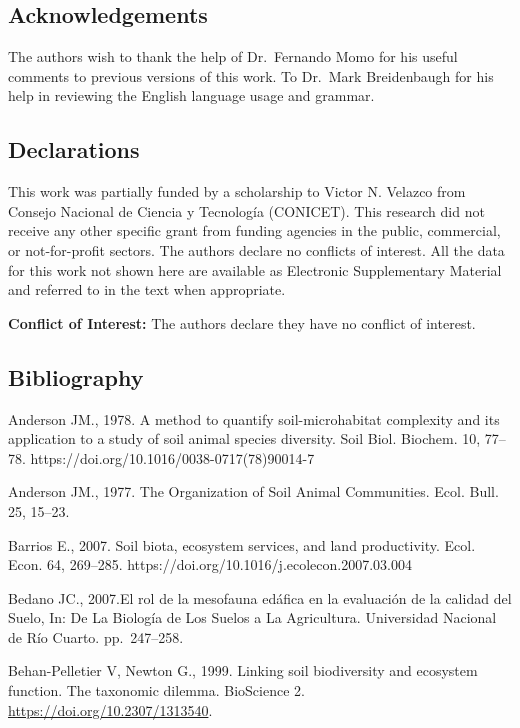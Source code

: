 \documentclass[10pt,oneside]{article}
\begin{document}
\hypertarget{acknowledgements}{%
\subsection{Acknowledgements}\label{acknowledgements}}

The authors wish to thank the help of Dr.~Fernando Momo for his useful
comments to previous versions of this work. To Dr.~Mark Breidenbaugh for
his help in reviewing the English language usage and grammar.

\hypertarget{declarations}{%
\subsection{Declarations}\label{declarations}}

This work was partially funded by a scholarship to Victor N. Velazco
from Consejo Nacional de Ciencia y Tecnología (CONICET). This research
did not receive any other specific grant from funding agencies in the
public, commercial, or not-for-profit sectors. The authors declare no
conflicts of interest. All the data for this work not shown here are
available as Electronic Supplementary Material and referred to in the
text when appropriate.

\textbf{Conflict of Interest:} The authors declare they have no conflict
of interest.

\hypertarget{bibliography}{%
\subsection{Bibliography}\label{bibliography}}

Anderson JM., 1978. A method to quantify soil-microhabitat complexity
and its application to a study of soil animal species diversity. Soil
Biol. Biochem. 10, 77--78. https://doi.org/10.1016/0038-0717(78)90014-7

Anderson JM., 1977. The Organization of Soil Animal Communities. Ecol.
Bull. 25, 15--23.

Barrios E., 2007. Soil biota, ecosystem services, and land productivity.
Ecol. Econ. 64, 269--285. https://doi.org/10.1016/j.ecolecon.2007.03.004

Bedano JC., 2007.El rol de la mesofauna edáfica en la evaluación de la
calidad del Suelo, In: De La Biología de Los Suelos a La Agricultura.
Universidad Nacional de Río Cuarto. pp.~247--258.

Behan-Pelletier V, Newton G., 1999. Linking soil biodiversity and
ecosystem function. The taxonomic dilemma. BioScience 2.
\url{https://doi.org/10.2307/1313540}.
\end{document}
